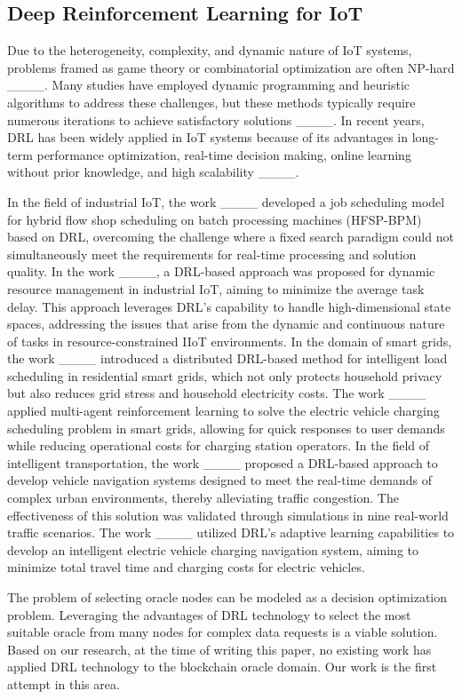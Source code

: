 \subsection{Deep Reinforcement Learning for IoT}
Due to the heterogeneity, complexity, and dynamic nature of IoT systems, problems framed as game theory or combinatorial optimization are often NP-hard ____. Many studies have employed dynamic programming and heuristic algorithms to address these challenges, but these methods typically require numerous iterations to achieve satisfactory solutions ____. In recent years, DRL has been widely applied in IoT systems because of its advantages in long-term performance optimization, real-time decision making, online learning without prior knowledge, and high scalability ____.

In the field of industrial IoT, the work ____ developed a job scheduling model for hybrid flow shop scheduling on batch processing machines (HFSP-BPM) based on DRL, overcoming the challenge where a fixed search paradigm could not simultaneously meet the requirements for real-time processing and solution quality. In the work ____, a DRL-based approach was proposed for dynamic resource management in industrial IoT, aiming to minimize the average task delay. This approach leverages DRL’s capability to handle high-dimensional state spaces, addressing the issues that arise from the dynamic and continuous nature of tasks in resource-constrained IIoT environments. In the domain of smart grids, the work ____ introduced a distributed DRL-based method for intelligent load scheduling in residential smart grids, which not only protects household privacy but also reduces grid stress and household electricity costs. The work ____ applied multi-agent reinforcement learning to solve the electric vehicle charging scheduling problem in smart grids, allowing for quick responses to user demands while reducing operational costs for charging station operators. In the field of intelligent transportation, the work ____ proposed a DRL-based approach to develop vehicle navigation systems designed to meet the real-time demands of complex urban environments, thereby alleviating traffic congestion. The effectiveness of this solution was validated through simulations in nine real-world traffic scenarios. The work ____ utilized DRL’s adaptive learning capabilities to develop an intelligent electric vehicle charging navigation system, aiming to minimize total travel time and charging costs for electric vehicles.

The problem of selecting oracle nodes can be modeled as a decision optimization problem. Leveraging the advantages of DRL technology to select the most suitable oracle from many nodes for complex data requests is a viable solution. Based on our research, at the time of writing this paper, no existing work has applied DRL technology to the blockchain oracle domain. Our work is the first attempt in this area.
